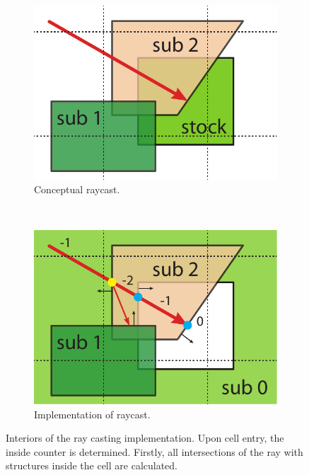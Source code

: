 \begin{figure}
	\centering
	\begin{subfigure}[t]{0.44\textwidth}
		\centering
		\includegraphics[width=\textwidth]{images/raycast_grid}
		\caption{Conceptual raycast.}
		\label{fig:raycast_grid}
	\end{subfigure}
	~
	\begin{subfigure}[t]{0.44\textwidth}
		\centering
		\includegraphics[width=\textwidth]{images/raycast_inside_counter}
		\caption{Implementation of raycast.}
		\label{fig:raycast_inside_counter}
	\end{subfigure}
	\caption{
		Interiors of the ray casting implementation.
		Upon cell entry, the inside counter is determined.
		Firstly, all intersections of the ray with structures inside the cell are calculated.
}
\end{figure}
